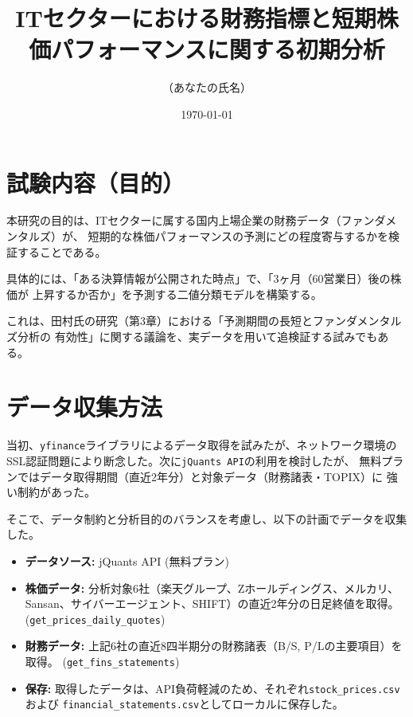 \documentclass[a4paper, 11pt]{ltjsarticle}
\title{ITセクターにおける財務指標と短期株価パフォーマンスに関する初期分析}
\author{（あなたの氏名）}
\date{\today}
\begin{document}
\maketitle

\section{試験内容（目的）}
本研究の目的は、ITセクターに属する国内上場企業の財務データ（ファンダメンタルズ）が、
短期的な株価パフォーマンスの予測にどの程度寄与するかを検証することである。

具体的には、「ある決算情報が公開された時点」で、「3ヶ月（60営業日）後の株価が
上昇するか否か」を予測する二値分類モデルを構築する。

これは、田村氏の研究（第3章）における「予測期間の長短とファンダメンタルズ分析の
有効性」に関する議論を、実データを用いて追検証する試みでもある。

\section{データ収集方法}
当初、\texttt{yfinance}ライブラリによるデータ取得を試みたが、ネットワーク環境の
SSL認証問題により断念した。次に\texttt{jQuants API}の利用を検討したが、
無料プランではデータ取得期間（直近2年分）と対象データ（財務諸表・TOPIX）に
強い制約があった。

そこで、データ制約と分析目的のバランスを考慮し、以下の計画でデータを収集した。

\begin{itemize}
  \item \textbf{データソース:} jQuants API (無料プラン)
  \item \textbf{株価データ:} 分析対象6社（楽天グループ、Zホールディングス、メルカリ、Sansan、サイバーエージェント、SHIFT）の直近2年分の日足終値を取得。
  (\texttt{get\_prices\_daily\_quotes})
  \item \textbf{財務データ:} 上記6社の直近8四半期分の財務諸表（B/S, P/Lの主要項目）を取得。
  (\texttt{get\_fins\_statements})
  \item \textbf{保存:} 取得したデータは、API負荷軽減のため、それぞれ\texttt{stock\_prices.csv}および
  \texttt{financial\_statements.csv}としてローカルに保存した。
\end{itemize}
\end{document}

